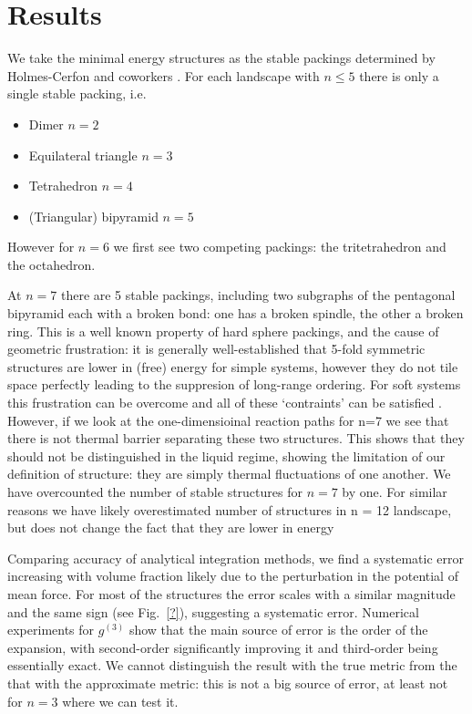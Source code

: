 \documentclass[11pt,twoside]{report}
\begin{document}
\section{Results}

We take the minimal energy structures as the stable packings determined by Holmes-Cerfon and coworkers \cite{Arkus?,Holmes-Cerfon?}.
For each landscape with $n \le 5$ there is only a single stable packing, i.e.\
\begin{itemize}
\item Dimer $n=2$
\item Equilateral triangle $n=3$
\item Tetrahedron $n=4$
\item (Triangular) bipyramid $n=5$
\end{itemize}
However for $n = 6$ we first see two competing packings: the tritetrahedron and the octahedron.

At $n = 7$ there are 5 stable packings, including two subgraphs of the pentagonal bipyramid each with a broken bond: one has a broken spindle, the other a broken ring.
This is a well known property of hard sphere packings, and the cause of geometric frustration: it is generally well-established \cite{?,?,?,Robinson?} that 5-fold symmetric structures are lower in (free) energy for simple systems, however they do not tile space perfectly leading to the suppresion of long-range ordering.
For soft systems this frustration can be overcome and all of these `contraints' can be satisfied \cite{Frank,Wales}.
However, if we look at the one-dimensioinal reaction paths for n=7 we see that there is not thermal barrier separating these two structures.
This shows that they should not be distinguished in the liquid regime, showing the limitation of our definition of structure: they are simply thermal fluctuations of one another.
We have overcounted the number of stable structures for $n=7$ by one.
For similar reasons we have likely overestimated number of structures in n = 12 landscape, but does not change the fact that they are lower in energy

Comparing accuracy of analytical integration methods, we find a systematic error increasing with volume fraction likely due to the perturbation in the potential of mean force.
For most of the structures the error scales with a similar magnitude and the same sign (see Fig.\ \ref{?}), suggesting a systematic error.
Numerical experiments for $g^{(3)}$ show that the main source of error is the order of the expansion, with second-order significantly improving it and third-order being essentially exact.
We cannot distinguish the result with the true metric from the that with the approximate metric: this is not a big source of error, at least not for $n=3$ where we can test it.
\end{document}

